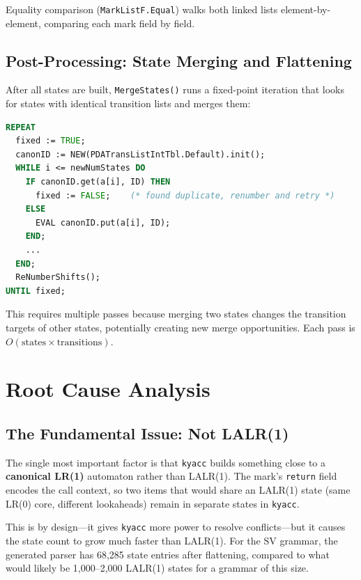 \documentclass[11pt]{article}
\begin{document}
Equality comparison (\texttt{MarkListF.Equal}) walks both linked
lists element-by-element, comparing each mark field by field.

\subsection{Post-Processing: State Merging and Flattening}

After all states are built, \texttt{MergeStates()} runs a
fixed-point iteration that looks for states with identical transition
lists and merges them:

\begin{lstlisting}[language=Modula2]
REPEAT
  fixed := TRUE;
  canonID := NEW(PDATransListIntTbl.Default).init();
  WHILE i <= newNumStates DO
    IF canonID.get(a[i], ID) THEN
      fixed := FALSE;    (* found duplicate, renumber and retry *)
    ELSE
      EVAL canonID.put(a[i], ID);
    END;
    ...
  END;
  ReNumberShifts();
UNTIL fixed;
\end{lstlisting}

This requires multiple passes because merging two states changes
the transition targets of other states, potentially creating new
merge opportunities.  Each pass is $O(\text{states} \times
\text{transitions})$.

\section{Root Cause Analysis}

\subsection{The Fundamental Issue: Not LALR(1)}

The single most important factor is that \texttt{kyacc} builds
something close to a \textbf{canonical LR(1)} automaton rather than
LALR(1).  The mark's \texttt{return} field encodes the call context,
so two items that would share an LALR(1) state (same LR(0) core,
different lookaheads) remain in separate states in \texttt{kyacc}.

This is by design---it gives \texttt{kyacc} more power to resolve
conflicts---but it causes the state count to grow much faster than
LALR(1).  For the SV grammar, the generated parser has 68,285 state
entries after flattening, compared to what would likely be 1,000--2,000
LALR(1) states for a grammar of this size.
\end{document}
